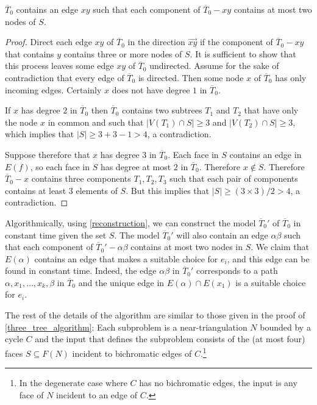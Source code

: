 \documentclass{patmorin}
\begin{document}
\begin{clm}\label{director}
  $\overline{T}_0$ contains an edge $xy$ such that each component of $\overline{T}_0-xy$ contains at most two nodes of $S$.
\end{clm}

\begin{proof}
  Direct each edge $xy$ of $\overline{T}_0$ in the direction $\overrightarrow{xy}$ if the component of $\overline{T}_0-xy$ that contains $y$ contains three or more nodes of $S$.  It is sufficient to show that this process leaves some edge $xy$ of $\overline{T}_0$ undirected.  Assume for the sake of contradiction that every edge of $\overline{T}_0$ is directed.  Then some node $x$ of $\overline{T}_0$ has only incoming edges. Certainly $x$ does not have degree $1$ in $\overline{T}_0$.

  If $x$ has degree $2$ in $\overline{T}_0$ then $\overline{T}_0$ contains two subtrees $T_1$ and $T_2$ that have only the node $x$ in common and such that $|V(T_1)\cap S|\ge 3$ and $|V(T_2)\cap S|\ge 3$, which implies that $|S|\ge 3+3-1 > 4$, a contradiction.

  Suppose therefore that $x$ has degree $3$ in $\overline{T}_0$.  Each face in $S$ contains an edge in $E(f)$, so each face in $S$ has degree at most $2$ in $\overline{T}_0$.  Therefore $x\not\in S$.  Therefore $\overline{T}_0-x$ contains three components $T_1, T_2, T_3$ such that each pair of components contains at least $3$ elements of $S$.  But this implies that $|S|\ge (3\times 3)/2>4$, a contradiction.
\end{proof}



Algorithmically, using \cref{reconstruction}, we can construct the model $\overline{T}_0'$ of $\overline{T}_0$ in constant time given the set $S$.  The model $\overline{T}_0'$ will also contain an edge $\alpha\beta$ such that each component of $\overline{T}_0'-\alpha\beta$ contains at most two nodes in $S$. We claim that $E(\alpha)$  contains an edge that makes a suitable choice for $e_i$, and this edge can be found in constant time.  Indeed, the edge $\alpha\beta$ in  $\overline{T}_0'$ corresponds to a path $\alpha,x_1,\ldots,x_k,\beta$ in $\overline{T}_0$ and the unique edge in $E(\alpha)\cap E(x_1)$ is a suitable choice for $e_i$.  

The rest of the details of the algorithm are similar to those given in the proof of \cref{three_tree_algorithm}:  Each subproblem is a near-triangulation $N$ bounded by a cycle $C$ and the input that defines the subproblem consists of the (at most four) faces $S\subseteq F(N)$ incident to bichromatic edges of $C$.\footnote{In the degenerate case where $C$ has no bichromatic edges, the input is any face of $N$ incident to an edge of $C$.}
\end{document}
